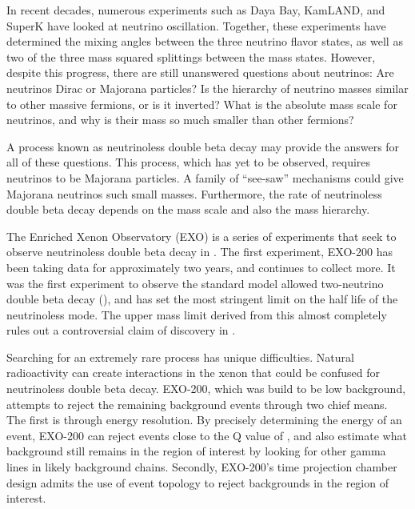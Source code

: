 \documentclass[herrin-thesis.tex]{subfiles}
\begin{document}
In recent decades, numerous experiments such as Daya Bay, KamLAND, and SuperK  have looked at neutrino oscillation. Together, these experiments have determined the mixing angles between the three neutrino flavor states, as well as two of the three mass squared splittings between the mass states. However, despite this progress, there are still unanswered questions about neutrinos: Are neutrinos Dirac or Majorana particles? Is the hierarchy of neutrino masses similar to other massive fermions, or is it inverted? What is the absolute mass scale for neutrinos, and why is their mass so much smaller than other fermions?

A process known as neutrinoless double beta decay may provide the answers for all of these questions. This process, which has yet to be observed, requires neutrinos to be Majorana particles. A family of ``see-saw'' mechanisms could give Majorana neutrinos such small masses. Furthermore, the rate of neutrinoless double beta decay depends on the mass scale and also the mass hierarchy.

The Enriched Xenon Observatory (EXO) is a series of experiments that seek to observe neutrinoless double beta decay in . The first experiment, EXO-200 has been taking data for approximately two years, and continues to collect more. It was the first experiment to observe the standard model allowed two-neutrino double beta decay (\twonu)\cite{Ackerman:2011gz}, and has set the most stringent limit on the half life of the neutrinoless mode\cite{Auger:2012ar}. The upper mass limit derived from this almost completely rules out a controversial claim of discovery in .

Searching for an extremely rare process has unique difficulties. Natural radioactivity can create interactions in the xenon that could be confused for neutrinoless double beta decay. EXO-200, which was build to be low background, attempts to reject the remaining background events through two chief means. The first is through energy resolution. By precisely determining the energy of an event, EXO-200 can reject events close to the Q value of , and also estimate what background still remains in the region of interest by looking for other gamma lines in likely background chains. Secondly, EXO-200's time projection chamber design admits the use of event topology to reject backgrounds in the region of interest.
\end{document}
